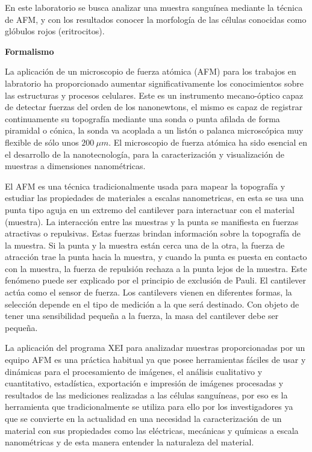 En este laboratorio se busca analizar una muestra sanguínea mediante la técnica de AFM, y con los resultados conocer la morfología de las células conocidas como glóbulos rojos (eritrocitos).

\textbf{\textcolor{azul50}{Formalismo}}

La aplicación de un microscopio de fuerza atómica (AFM) para los trabajos en labratorio  ha proporcionado aumentar significativamente los conocimientos sobre las estructuras y procesos celulares. Este es un instrumento mecano-óptico capaz de detectar fuerzas del orden de los nanonewtons, el mismo es capaz de registrar continuamente su topografía mediante una sonda o punta afilada de forma piramidal o cónica, la sonda va acoplada a un listón o palanca microscópica muy flexible de sólo unos $200~\mu m$. El microscopio de fuerza atómica ha sido esencial en el desarrollo de la nanotecnología, para la caracterización y visualización de muestras a dimensiones nanométricas.

El AFM es una técnica tradicionalmente usada para mapear la topografía y estudiar las propiedades de materiales a escalas nanometricas, en esta se usa una punta tipo aguja en un extremo del cantilever para interactuar con el material (muestra). La interacción entre las muestras y la punta se manifiesta en fuerzas atractivas o repulsivas. Estas fuerzas brindan información sobre la topografía de la muestra. Si la punta y la muestra están cerca una de la otra, la fuerza de atracción trae la punta hacia la muestra, y cuando la punta es puesta en contacto con la muestra, la fuerza de repulsión rechaza a la punta lejos de la muestra. Este fenómeno puede ser
explicado por el principio de exclusión de Pauli. El cantilever actúa como el sensor de fuerza. Los cantilevers vienen en diferentes formas, la selección depende en el tipo de medición a la que será destinado. Con objeto de tener una sensibilidad pequeña a la fuerza, la masa del cantilever debe ser pequeña.

La aplicación del programa XEI para analizadar muestras proporcionadas por un equipo AFM es una práctica habitual ya que posee herramientas fáciles de usar y dinámicas para el procesamiento de imágenes, el análisis cualitativo y cuantitativo,
estadística, exportación e impresión de imágenes procesadas y resultados de las mediciones realizadas a las células sanguíneas, por eso es la herramienta que tradicionalmente se utiliza para ello por los investigadores ya que se convierte en la actualidad en una necesidad la caracterización de un
material con sus propiedades como las eléctricas,
mecánicas y químicas a escala nanométricas y de esta manera entender la naturaleza del
material.

